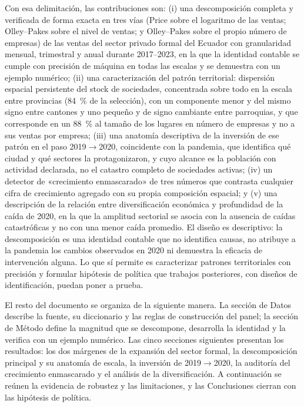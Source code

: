 \documentclass[12pt,a4paper]{article}
\begin{document}
\par\vspace{6pt}
Con esa delimitación, las contribuciones son: (i) una descomposición completa y verificada de forma exacta en tres vías (Price sobre el logaritmo de las ventas; Olley--Pakes sobre el nivel de ventas; y Olley--Pakes sobre el propio número de empresas) de las ventas del sector privado formal del Ecuador con granularidad mensual, trimestral y anual durante 2017--2023, en la que la identidad contable se cumple con precisión de máquina en todas las escalas y se demuestra con un ejemplo numérico; (ii) una caracterización del patrón territorial: dispersión espacial persistente del stock de sociedades, concentrada sobre todo en la escala entre provincias (84~\% de la selección), con un componente menor y del mismo signo entre cantones y uno pequeño y de signo cambiante entre parroquias, y que corresponde en un 88~\% al tamaño de los lugares en número de empresas y no a sus ventas por empresa; (iii) una anatomía descriptiva de la inversión de ese patrón en el paso 2019$\to$2020, coincidente con la pandemia, que identifica qué ciudad y qué sectores la protagonizaron, y cuyo alcance es la población con actividad declarada, no el catastro completo de sociedades activas; (iv) un detector de «crecimiento enmascarado» de tres números que contrasta cualquier cifra de crecimiento agregado con su propia composición espacial; y (v) una descripción de la relación entre diversificación económica y profundidad de la caída de 2020, en la que la amplitud sectorial se asocia con la ausencia de caídas catastróficas y no con una menor caída promedio. El diseño es descriptivo: la descomposición es una identidad contable que no identifica causas, no atribuye a la pandemia los cambios observados en 2020 ni demuestra la eficacia de intervención alguna. Lo que sí permite es caracterizar patrones territoriales con precisión y formular hipótesis de política que trabajos posteriores, con diseños de identificación, puedan poner a prueba.
\par\vspace{6pt}
El resto del documento se organiza de la siguiente manera. La sección de Datos describe la fuente, su diccionario y las reglas de construcción del panel; la sección de Método define la magnitud que se descompone, desarrolla la identidad y la verifica con un ejemplo numérico. Las cinco secciones siguientes presentan los resultados: los dos márgenes de la expansión del sector formal, la descomposición principal y su anatomía de escala, la inversión de 2019$\to$2020, la auditoría del crecimiento enmascarado y el análisis de la diversificación. A continuación se reúnen la evidencia de robustez y las limitaciones, y las Conclusiones cierran con las hipótesis de política.
\par
\endgroup
\end{document}
